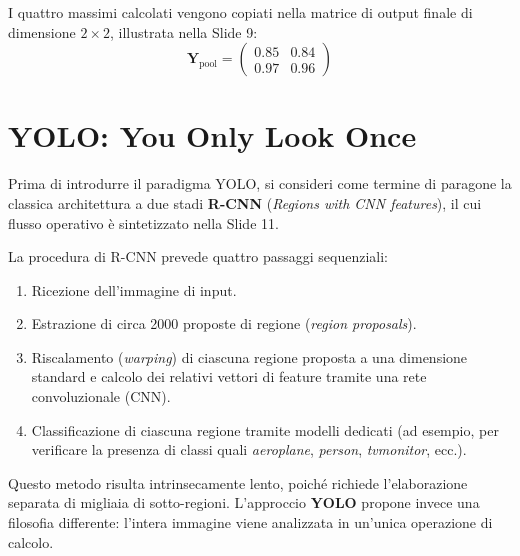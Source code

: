 ﻿\documentclass[11pt, a4paper]{article}
\begin{document}
I quattro massimi calcolati vengono copiati nella matrice di output finale di dimensione $2 \times 2$, illustrata nella Slide 9:
\[
\bm{Y}_{\text{pool}} = \begin{pmatrix}
0.85 & 0.84 \\
0.97 & 0.96
\end{pmatrix}
\]

\newpage

\section{YOLO: You Only Look Once}

Prima di introdurre il paradigma YOLO, si consideri come termine di paragone la classica architettura a due stadi \textbf{R-CNN} (\emph{Regions with CNN features}), il cui flusso operativo è sintetizzato nella Slide 11.


La procedura di R-CNN prevede quattro passaggi sequenziali:
\begin{enumerate}
    \item Ricezione dell'immagine di input.
    \item Estrazione di circa 2000 proposte di regione (\emph{region proposals}).
    \item Riscalamento (\emph{warping}) di ciascuna regione proposta a una dimensione standard e calcolo dei relativi vettori di feature tramite una rete convoluzionale (CNN).
    \item Classificazione di ciascuna regione tramite modelli dedicati (ad esempio, per verificare la presenza di classi quali \emph{aeroplane}, \emph{person}, \emph{tvmonitor}, ecc.).
\end{enumerate}

Questo metodo risulta intrinsecamente lento, poiché richiede l'elaborazione separata di migliaia di sotto-regioni. L'approccio \textbf{YOLO} propone invece una filosofia differente: l'intera immagine viene analizzata in un'unica operazione di calcolo.

\end{document}

